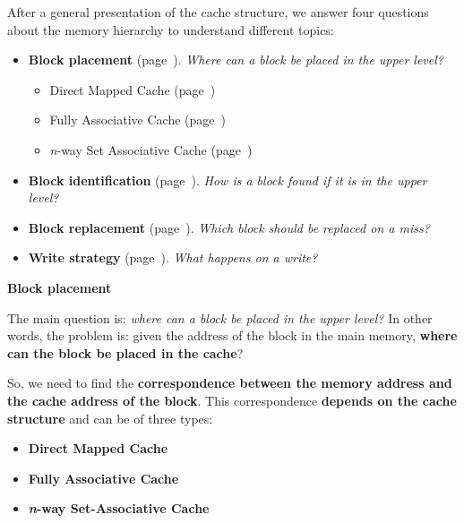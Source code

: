 \noindent
After a general presentation of the cache structure, we answer four questions about the memory hierarchy to understand different topics: 
\begin{itemize}
    \item \textbf{Block placement} (page~\hyperlink{Block placement}{}). \emph{Where can a block be placed in the upper level?}
    \begin{itemize}
        \item Direct Mapped Cache (page~\hyperlink{Direct Mapped Cache}{})

        \item Fully Associative Cache (page~\hyperlink{Fully Associative Cache}{})
        
        \item \emph{n}-way Set Associative Cache (page~\hyperlink{n-way Set Associative Cache}{})
    \end{itemize}
    
    \item \textbf{Block identification} (page~\hyperlink{Block identification}{}). \emph{How is a block found if it is in the upper level?}
    
    \item \textbf{Block replacement} (page~\hyperlink{Block replacement}{}). \emph{Which block should be replaced on a miss?}
    
    \item \textbf{Write strategy} (page~\hyperlink{Write strategy}{}). \emph{What happens on a write?}
\end{itemize}

\newpage

\begin{center}
    \large
    \label{Block placement}
    \hypertarget{Block placement}{\textcolor{Red2}{\textbf{Block placement}}}
\end{center}

\noindent
The main question is: \emph{where can a block be placed in the upper level?} In other words, the problem is: given the address of the block in the main memory, \textbf{where can the block be placed in the cache}?

\highspace
So, we need to find the \textbf{correspondence between the memory address and the cache address of the block}. This correspondence \textbf{depends on the cache structure} and can be of three types:
\begin{itemize}
    \item \textbf{Direct Mapped Cache}
    \item \textbf{Fully Associative Cache}
    \item \textbf{\emph{n}-way Set-Associative Cache}
\end{itemize}

